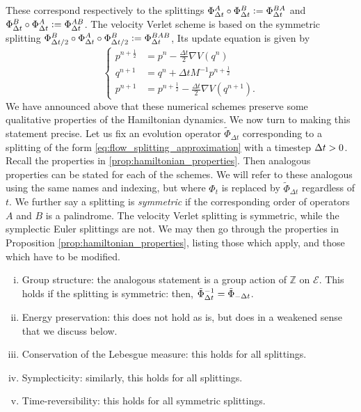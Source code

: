     These correspond respectively to the splittings
    $\Phi_{\Delta t}^A\circ\Phi_{\Delta t}^B\mathrel{\mathop:}= \Phi_{\Delta t}^{BA}$
    and
    $\Phi_{\Delta t}^B\circ\Phi_{\Delta t}^A\mathrel{\mathop:}= \Phi_{\Delta t}^{AB}$.
    The velocity Verlet scheme is based on the symmetric splitting
    $\Phi_{\Delta t/2}^B\circ\Phi_{\Delta t}^A\circ\Phi_{\Delta t/2}^B\mathrel{\mathop:}= \Phi_{\Delta t}^{BAB}$,
    Its update equation is given by
    \begin{equation}\label{eq:verlet}
        \left\{\begin{aligned}
             p^{n+\frac12} &=p^n - \frac{\Delta t}{2}\nabla V(q^n)\\
             q^{n+1} &=q^n + \Delta t M^{-1}p^{n+\frac 12}\\
             p^{n+1} &= p^{n+\frac12}-\frac{\Delta t}{2}\nabla V(q^{n+1}).
        \end{aligned}\right.
    \end{equation}
    We have announced above that these numerical schemes preserve some qualitative properties of the Hamiltonian dynamics. We now turn to making this statement precise.
    Let us fix an evolution operator $\tilde\Phi_{\Delta t}$ corresponding to a splitting of the form \eqref{eq:flow_splitting_approximation} with a timestep ${\Delta t}>0$.
    Recall the properties in \ref{prop:hamiltonian_properties}. Then analogous properties can be stated for each of the schemes. We will refer to these analogous using the same names and indexing, but where $\Phi_t$ is replaced by $\tilde\Phi_{\Delta t}$ regardless of $t$.
    We further say a splitting is \textit{symmetric} if the corresponding order of operators $A$ and $B$ is a palindrome. The velocity Verlet splitting is symmetric, while the symplectic Euler splittings are not.
    We may then go through the properties in Proposition \ref{prop:hamiltonian_properties}, listing those which apply, and those which have to be modified.
        \begin{enumerate}[i)]
            \item Group structure: the analogous statement is a group action of $\mathbb{Z}$ on $\mathcal E$. This holds if the splitting is symmetric: then, $\tilde\Phi_{{\Delta t}}^{-1}=\tilde\Phi_{-{\Delta t}}$.
            \item Energy preservation: this does not hold as is, but does in a weakened sense that we discuss below.
            \item Conservation of the Lebesgue measure: this holds for all splittings.
            \item Symplecticity: similarly, this holds for all splittings.
            \item Time-reversibility: this holds for all symmetric splittings.
        \end{enumerate}
